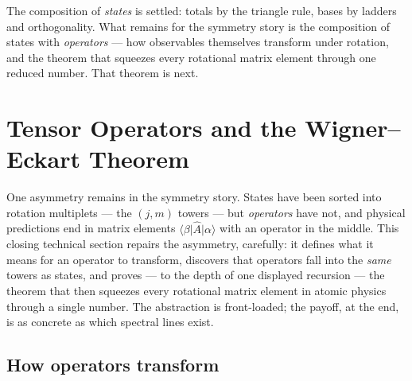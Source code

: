 \documentclass[11pt]{article}
\theoremstyle{plain}
\theoremstyle{definition}
\theoremstyle{remark}
\newcommand{\op}[1]{\hat{#1}}
\newcommand{\ket}[1]{\lvert #1 \rangle}
\newcommand{\bra}[1]{\langle #1 \rvert}
\begin{document}
\medskip
\noindent
The composition of \emph{states} is settled: totals by the triangle
rule, bases by ladders and orthogonality. What remains for the
symmetry story is the composition of states with \emph{operators}
--- how observables themselves transform under rotation, and the
theorem that squeezes every rotational matrix element through one
reduced number. That theorem is next.


\section{Tensor Operators and the Wigner--Eckart Theorem}
\label{sec:wigner-eckart}

One asymmetry remains in the symmetry story. States have been
sorted into rotation multiplets --- the $(j, m)$ towers --- but
\emph{operators} have not, and physical predictions end in
matrix elements $\bra{\beta}\op A\ket{\alpha}$ with an operator in
the middle. This closing technical section repairs the asymmetry,
carefully: it defines what it means for an operator to transform,
discovers that operators fall into the \emph{same} towers as
states, and proves --- to the depth of one displayed
recursion --- the theorem that then squeezes every rotational
matrix element in atomic physics through a single number. The
abstraction is front-loaded; the payoff, at the end, is as concrete
as which spectral lines exist.

\subsection{How operators transform}
\label{sec:operator-transform}
\end{document}

